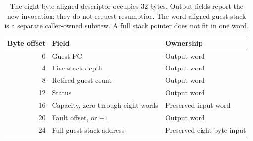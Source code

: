 \begin{table}[htbp]
  \centering
  \begin{tabular}{r l l}
    \toprule
    Byte offset & Field                              & Ownership                  \\
    \midrule
    0           & Guest PC                           & Output word                \\
    4           & Live stack depth                   & Output word                \\
    8           & Retired guest count                & Output word                \\
    12          & Status                             & Output word                \\
    16          & Capacity, zero through eight words & Preserved input word       \\
    20          & Fault offset, or $-1$              & Output word                \\
    24          & Full guest-stack address           & Preserved eight-byte input \\
    \bottomrule
  \end{tabular}
  \caption{The eight-byte-aligned descriptor occupies 32 bytes. Output fields report the new invocation; they do not request resumption. The word-aligned guest stack is a separate caller-owned subview. A full stack pointer does not fit in one word.}
  \label{tab:revision-bytecode-descriptor}
\end{table}
